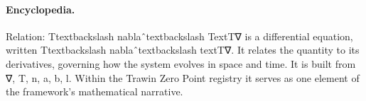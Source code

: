 \paragraph{Encyclopedia.}
Relation: Ttextbackslash nablaˆtextbackslash TextT∇ is a differential equation, written Ttextbackslash nablaˆtextbackslash textT∇. It relates the quantity to its derivatives, governing how the system evolves in space and time. It is built from ∇, T, n, a, b, l. Within the Trawin Zero Point registry it serves as one element of the framework's mathematical narrative.
